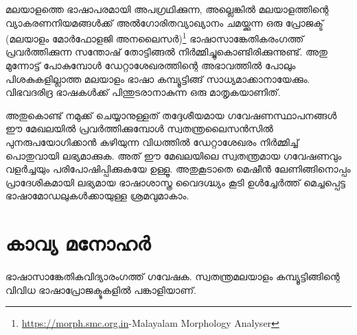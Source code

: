 \documentclass[12pt,twoside,a4paper]{article}
\begin{document}
മലയാളത്തെ ഭാഷാപരമായി അപഗ്രഥിക്കുന്ന, അല്ലെങ്കിൽ മലയാളത്തിന്റെ വ്യാകരണനിയമങ്ങൾക്ക് അൽഗോരിതവ്യാഖ്യാനം ചമയ്ക്കുന്ന ഒരു പ്രോജക്ട് (മലയാളം മോർഫോളജി അനലൈസർ)\footnote{{\url{https://morph.smc.org.in}-{Malayalam Morphology Analyser}}} ഭാഷാസാങ്കേതികരംഗത്ത് പ്രവർത്തിക്കുന്ന സന്തോഷ് തോട്ടിങ്ങൽ നിർമ്മിച്ചുകൊണ്ടിരിക്കുന്നുണ്ട്. അതു മുന്നോട്ട് പോകുമ്പോൾ ഡേറ്റാശേഖരത്തിന്റെ അഭാവത്തിൽ പോലും പിശകുകളില്ലാത്ത മലയാളം ഭാഷാ കമ്പ്യൂട്ടിങ്ങ് സാധ്യമാക്കാനായേക്കും. വിഭവദരിദ്ര ഭാഷകൾക്ക് പിന്തുടരാനാകുന്ന ഒരു മാതൃകയാണിത്.

അതുകൊണ്ട് നമുക്ക് ചെയ്യാനുള്ളത് തദ്ദേശീയമായ ഗവേഷണസ്ഥാപനങ്ങൾ ഈ മേഖലയിൽ പ്രവർത്തിക്കുമ്പോൾ സ്വതന്ത്രലൈസൻസിൽ പുനരുപയോഗിക്കാൻ കഴിയുന്ന വിധത്തിൽ ഡേറ്റാശേഖരം നിർമ്മിച്ച് 
പൊതുവായി ലഭ്യമാക്കുക.  അത് ഈ മേഖലയിലെ സ്വതന്ത്രമായ ഗവേഷണവും വളർച്ചയും പരിപോഷിപ്പിക്കുകയേ ഉള്ളൂ. അതുകൂടാതെ മെഷീൻ ലേണിങ്ങിനൊപ്പം പ്രാദേശികമായി ലഭ്യമായ ഭാഷാശാസ്ത്ര വൈദഗ്ദ്ധ്യം കൂടി ഉൾച്ചേർത്ത് മെച്ചപ്പെട്ട ഭാഷാമോഡലുകൾക്കായുള്ള ശ്രമവുമാകാം. 

\newpage

\section*{കാവ്യ മനോഹർ}
\paragraph{}
ഭാഷാസാങ്കേതികവിദ്യാരംഗത്ത് ഗവേഷക. സ്വതന്ത്രമലയാളം കമ്പ്യൂട്ടിങ്ങിന്റെ വിവിധ ഭാഷാപ്രോജക്ടുകളിൽ പങ്കാളിയാണ്. 
 
\end{document}
